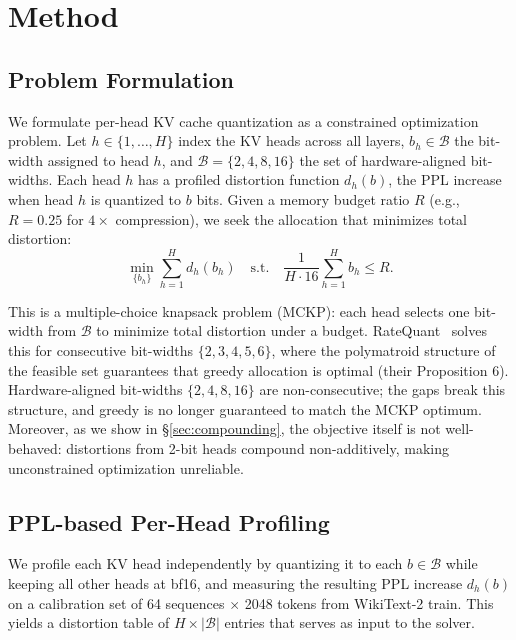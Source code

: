 \section{Method}
\label{sec:method}

\subsection{Problem Formulation}
\label{sec:formulation}

We formulate per-head KV cache quantization as a constrained optimization problem.
Let $h \in \{1,\ldots,H\}$ index the KV heads across all layers, $b_h \in \mathcal{B}$ the bit-width assigned to head $h$, and $\mathcal{B} = \{2, 4, 8, 16\}$ the set of hardware-aligned bit-widths.
Each head $h$ has a profiled distortion function $d_h(b)$, the PPL increase when head $h$ is quantized to $b$ bits.
Given a memory budget ratio $R$ (e.g., $R = 0.25$ for $4\times$ compression), we seek the allocation that minimizes total distortion:
\begin{equation}
\label{eq:objective}
\min_{\{b_h\}} \sum_{h=1}^{H} d_h(b_h) \quad \text{s.t.} \quad \frac{1}{H \cdot 16}\sum_{h=1}^{H} b_h \leq R.
\end{equation}

This is a multiple-choice knapsack problem (MCKP): each head selects one bit-width from $\mathcal{B}$ to minimize total distortion under a budget.
RateQuant~\cite{zuo2026ratequant} solves this for consecutive bit-widths $\{2,3,4,5,6\}$, where the polymatroid structure of the feasible set guarantees that greedy allocation is optimal (their Proposition 6).
Hardware-aligned bit-widths $\{2,4,8,16\}$ are non-consecutive; the gaps break this structure, and greedy is no longer guaranteed to match the MCKP optimum.
Moreover, as we show in \S\ref{sec:compounding}, the objective itself is not well-behaved: distortions from 2-bit heads compound non-additively, making unconstrained optimization unreliable.

\subsection{PPL-based Per-Head Profiling}
\label{sec:profiling}

We profile each KV head independently by quantizing it to each $b \in \mathcal{B}$ while keeping all other heads at bf16, and measuring the resulting PPL increase $d_h(b)$ on a calibration set of 64 sequences $\times$ 2048 tokens from WikiText-2 train.
This yields a distortion table of $H \times |\mathcal{B}|$ entries that serves as input to the solver.

